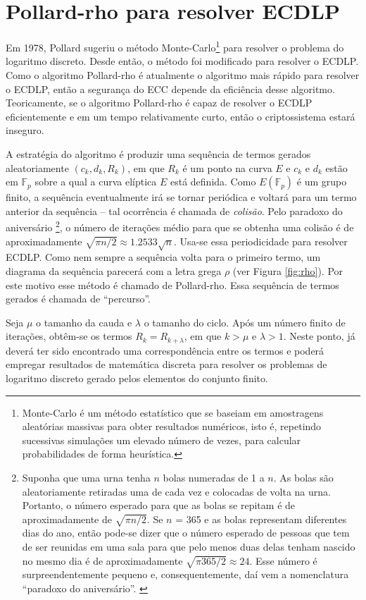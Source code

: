 \chapter{Pollard-rho para resolver ECDLP} \label{PR}
Em 1978, Pollard sugeriu o método Monte-Carlo\footnote{Monte-Carlo é um método estatístico que se baseiam em amostragens aleatórias massivas para obter resultados numéricos, isto é, repetindo sucessivas simulações um elevado número de vezes, para calcular probabilidades de forma heurística.} para resolver o problema do logaritmo discreto. Desde então, o método foi modificado para resolver o ECDLP. Como o algoritmo Pollard-rho é atualmente o algoritmo mais rápido para resolver o ECDLP, então a segurança do ECC depende da eficiência desse algoritmo. Teoricamente, se o algoritmo Pollard-rho é capaz de resolver o ECDLP eficientemente e em um tempo relativamente curto, então o criptossistema estará inseguro. \cite{Mandy:2007}

A estratégia do algoritmo é produzir uma sequência de termos gerados aleatoriamente $(c_k, d_k, R_k)$, em que \(R_k\) é um ponto na curva \(E\) e \(c_k\)  e \(d_k\) estão em $\mathbb{F}_p$ sobre a qual a curva elíptica \(E\) está definida. Como $E(\mathbb{F}_p)$ é um grupo finito, a sequência eventualmente irá se tornar periódica e voltará para um termo anterior da sequência \--- tal ocorrência é chamada de \textit{colisão}. Pelo paradoxo do aniversário
\footnote{Suponha que uma urna tenha \(n\) bolas numeradas de 1 a \(n\). As bolas são aleatoriamente retiradas uma de cada vez e colocadas de volta na urna. Portanto, o número esperado para que as bolas se repitam é de aproximadamente de $\sqrt{\pi n/2}$. Se \(n\) = 365 e as bolas representam diferentes dias do ano, então pode-se dizer que o número esperado de pessoas que tem de ser reunidas em uma sala para que pelo menos duas delas tenham nascido no mesmo dia é de aproximadamente $\sqrt{\pi 365/2} \approx 24$. Esse número é surpreendentemente pequeno e, consequentemente, daí vem a nomenclatura ``paradoxo do aniversário''. \cite{Guide}},
o número de iterações médio para que se obtenha uma colisão é de aproximadamente $\sqrt{\pi n/2} \approx 1.2533 \sqrt{n}$. Usa-se essa periodicidade para resolver ECDLP. Como nem sempre a sequência volta para o primeiro termo, um diagrama da sequência parecerá com a letra grega \(\rho\) (ver Figura \ref{fig:rho}). Por este motivo esse método é chamado de Pollard-rho. Essa sequência de termos gerados é chamada de ``percurso''. \cite{Guide}

Seja \(\mu\) o tamanho da cauda e \(\lambda\) o tamanho do ciclo. Após um número finito de iterações, obtêm-se os termos $R_k = R_{k+\lambda}$, em que $k > \mu$ e $\lambda > 1$. Neste ponto, já deverá ter sido encontrado uma correspondência entre os termos e poderá empregar resultados de matemática discreta para resolver os problemas de logaritmo discreto gerado pelos elementos do conjunto finito.

